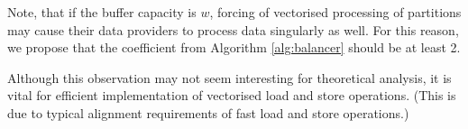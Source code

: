 \begin{rem} 
  Note, that if the buffer capacity is $w$, forcing of vectorised processing of partitions may cause their data providers to process data singularly as well. For this reason, we propose that the coefficient  from Algorithm \ref{alg:balancer} should be at least 2.
\end{rem}

\begin{rem} 
  Although this observation may not seem interesting for theoretical analysis, it is vital for efficient implementation of vectorised load and store operations. (This is due to typical alignment requirements of fast load and store operations.)
\end{rem}

